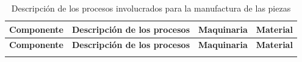 \begin{longtable}{@{}|c|r|l|l|c|}
	\caption{Descripción de los procesos involucrados para la manufactura de las piezas}\\
	\hline
	\rowcolor[rgb]{ .867,  .922,  .969} \textbf{Componente} & \multicolumn{2}{c|}{\textbf{Descripción de los procesos}} & \textbf{Maquinaria} & \textbf{Material} \\
	\hline \hline
	\endfirsthead
	
	\hline
	\rowcolor[rgb]{ .867,  .922,  .969} \textbf{Componente} & \multicolumn{2}{c|}{\textbf{Descripción de los procesos}} & \textbf{Maquinaria} & \textbf{Material} \\
	\hline \hline
	\endhead
	
	\multicolumn{6}{c}{}
	\endfoot
	
	\endlastfoot
	

\end{longtable}
